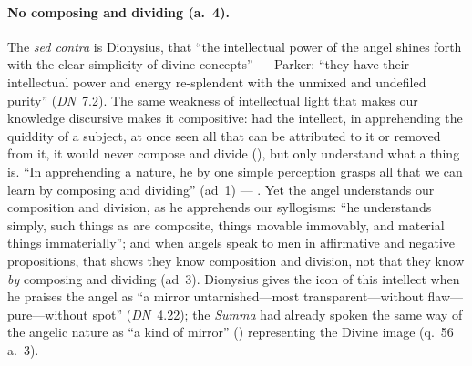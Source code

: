 \paragraph{No composing and dividing (a.~4).} The \emph{sed contra} is
Dionysius, that ``the intellectual power of the angel shines forth with
the clear simplicity of divine concepts'' --- Parker: ``they have their
intellectual power and energy re-splendent with the unmixed and undefiled
purity'' (\emph{DN}~7.2). The same weakness of intellectual light that
makes our knowledge discursive makes it compositive: had the intellect, in
apprehending the quiddity of a subject, at once seen all that can be attributed
to it or removed from it, it would never compose and divide
(), but only understand what a thing is. ``In
apprehending a nature, he by one simple perception grasps all that we can
learn by composing and dividing'' (ad~1) --- . Yet the angel understands our composition and division, as he
apprehends our syllogisms: ``he understands simply, such things as are
composite, things movable immovably, and material things immaterially'';
and when angels speak to men in affirmative and negative propositions,
that shows they know composition and division, not that they know
\emph{by} composing and dividing (ad~3). Dionysius gives the icon of this
intellect when he praises the angel as ``a mirror untarnished---most
transparent---without flaw---pure---without spot'' (\emph{DN}~4.22);
the \emph{Summa} had already spoken the same way of the angelic nature as
``a kind of mirror'' () representing the Divine
image (q.~56 a.~3).

